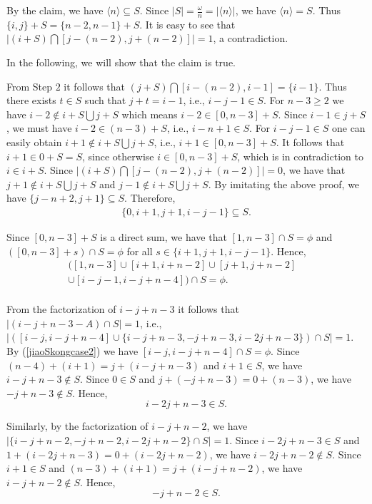 \documentclass[preprint]{elsarticle}
\begin{document}
By the claim, we have $\langle n\rangle\subseteq S$.
Since $|S|=\frac{\omega}{n}=|\langle n\rangle|$, we have $\langle n\rangle=S$.
Thus $\{i,j\}+S=\{n-2,n-1\}+S$.
It is easy to see that $|(i+S)\bigcap [j-(n-2),j+(n-2)]|=1$, a contradiction.

In the following, we will show that the claim is true.

From Step $2$ it follows that $(j+S)\bigcap [i-(n-2),i-1]=\{i-1\}$.
Thus there exists $t\in S$ such that $j+t=i-1$, i.e., $i-j-1\in S$.
For $n-3\geq 2$ we have $i-2\not\in i+S\bigcup j+S$ which means $i-2\in [0,n-3]+S$.
Since $i-1\in j+S$, we must have $i-2\in (n-3)+S$, i.e., $i-n+1\in S$.
For $i-j-1\in S$ one can easily obtain $i+1\not\in i+S\bigcup j+S$, i.e., $i+1\in [0,n-3]+S$.
It follows that $i+1\in 0+S=S$, since otherwise $i\in [0,n-3]+S$,
which is in contradiction to $i\in i+S$.
Since $|(i+S)\bigcap [j-(n-2),j+(n-2)]|=0$,
we have that $j+1\not\in i+S\bigcup j+S$ and $j-1\not\in i+S\bigcup j+S$.
By imitating the above proof, we have $\{j-n+2,j+1\}\subseteq S$.
Therefore, \begin{gather}
\{0,i+1,j+1,i-j-1\}\subseteq S.   \label{shuyuScase2}
\end{gather}

Since $[0,n-3]+S$ is a direct sum, we have that $[1,n-3]\cap S=\phi$ and $([0,n-3]+s)\cap S=\phi$ for all $s\in \{i+1,j+1,i-j-1\}$.
Hence,
\begin{equation}
\label{jiaoSkongcase2}
   \begin{aligned}
   ([1,n-3]\cup [i+1,i+n-2]\cup [j+1,j+n-2]& \\
   \cup [i-j-1,i-j+n-4])\cap S=\phi.&  \\
   \end{aligned}
  \end{equation}

From the factorization of $i-j+n-3$ it follows that $|(i-j+n-3-A)\cap S|=1$, i.e.,
$|([i-j,i-j+n-4]\cup \{i-j+n-3,-j+n-3,i-2j+n-3\})\cap S|=1$.
By (\ref{jiaoSkongcase2}) we have $[i-j,i-j+n-4]\cap S=\phi$.
Since $(n-4)+(i+1)=j+(i-j+n-3)$ and $i+1\in S$, we have $i-j+n-3\not\in S$.
Since $0\in S$ and $j+(-j+n-3)=0+(n-3)$, we have $-j+n-3\not\in S$.
Hence, $$i-2j+n-3\in S.$$

Similarly, by the factorization of $i-j+n-2$,
we have $|\{i-j+n-2,-j+n-2,i-2j+n-2\}\cap S|=1$.
Since $i-2j+n-3\in S$ and $1+(i-2j+n-3)=0+(i-2j+n-2)$, we have $i-2j+n-2\not\in S$.
Since $i+1\in S$ and $(n-3)+(i+1)=j+(i-j+n-2)$, we have $i-j+n-2\not\in S$.
Hence, $$-j+n-2\in S.$$
\end{document}

